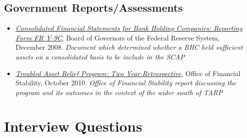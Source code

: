 \documentclass[justified, nobib]{tufte-handout2}
\begin{document}
\subsection{Government Reports/Assessments}

\begin{itemize}
\item
  \href{http://www.federalreserve.gov/reportforms/forms/FR_Y-9C20081231_f.pdf}{\emph{Consolidated
  Financial Statements for Bank Holding Companies: Reporting Form FR
  Y-9C}}, Board of Governors of the Federal Reserve System, December
  2008. \emph{Document which determined whether a BHC held sufficient
  assets on a consolidated basis to be include in the SCAP}
\item
  \href{http://www.treasury.gov/press-center/news/Documents/TARP\%20Two\%20Year\%20Retrospective_10\%2005\%2010_transmittal\%20letter.pdf}{\emph{Troubled
  Asset Relief Program: Two Year Retrospective}}, Office of Financial
  Stability, October 2010. \emph{Office of Financial Stability report
  discussing the program and its outcomes in the context of the wider
  swath of TARP}
\end{itemize}

\section{Interview Questions}
\end{document}
